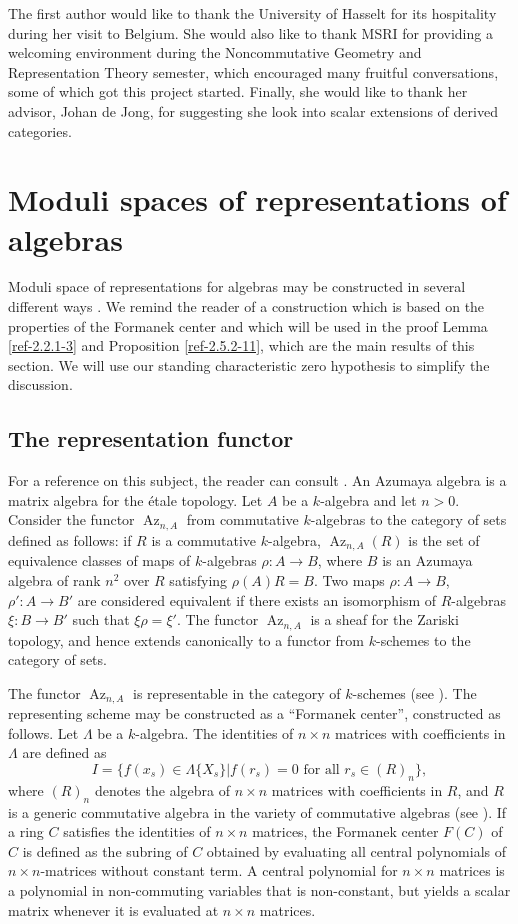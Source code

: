 \documentclass{amsart}
\numberwithin{equation}{section}
\theoremstyle{definition}
\theoremstyle{remark}
\begin{document}
The first author would like to thank the University of Hasselt for its hospitality during her visit to Belgium. She would also like to thank MSRI for providing a welcoming environment during the Noncommutative Geometry and Representation Theory semester, which encouraged many fruitful conversations, some of which got this project started. Finally, she would like to thank her advisor, Johan de Jong, for suggesting she look into scalar extensions of derived categories.

\section{Moduli spaces of representations of algebras}
Moduli space of representations for algebras 
may be constructed in several different ways \cite{King,Procesi2}.
We remind the reader of a construction which is based on the properties
of the Formanek center and which will be used in the proof Lemma \ref{ref-2.2.1-3} 
and Proposition \ref{ref-2.5.2-11}, which are the main results
of this section. We will use our standing characteristic zero hypothesis to simplify the discussion.
\subsection{The representation functor}
For a reference on this subject, the reader can consult \cite{Procesi2}. An Azumaya algebra is a matrix algebra for the \'etale topology. Let $A$ be a $k$-algebra and let $n>0$.  Consider the functor ${\operatorname{Az}}_{n,A}$
from commutative $k$-algebras to the category of sets defined as follows: if $R$
is a commutative $k$-algebra, ${\operatorname{Az}}_{n,A}(R)$ is the set of equivalence classes
of maps of $k$-algebras $\rho:A{\rightarrow} B$, where $B$ is an Azumaya algebra of rank $n^2$
over $R$ satisfying $\rho(A)R=B$. Two  maps $\rho:A{\rightarrow} B$,
$\rho':A{\rightarrow} B'$ are considered equivalent if there exists an isomorphism
of $R$-algebras $\xi:B{\rightarrow} B'$ such that $\xi\rho=\xi'$. The functor ${\operatorname{Az}}_{n,A}$ is
a sheaf for the Zariski topology, and hence extends canonically to a functor
from $k$-schemes to the category of sets.

The functor ${\operatorname{Az}}_{n,A}$ is representable in the category of $k$-schemes
(see \cite[Ch IV, Thm 1.8 and Ch VIII, Thm 2.2]{Procesi2}). The representing scheme may be constructed as a  ``Formanek
center'', constructed as follows. Let $\Lambda$ be a $k$-algebra. The identities of $n\times n$ matrices with coefficients in $\Lambda$ are defined as
$$I=\{f(x_s)\in \Lambda\{X_s\} | f(r_s)=0 \text{ for all }r_s \in (R)_n\},$$
where $(R)_n$ denotes the algebra of $n\times n$ matrices with coefficients in $R$, and $R$ is a generic commutative algebra in the variety of commutative algebras (see \cite[Definition 4.3]{Procesi2}). If a ring $C$ satisfies the identities of $n\times n$ matrices, the Formanek center $F(C)$ of $C$ is defined as the subring of $C$ obtained by evaluating all central polynomials of $n\times n$-matrices without constant term. A central polynomial for $n\times n$ matrices is a polynomial in non-commuting variables that is non-constant, but yields a scalar matrix whenever it is evaluated at $n\times n$ matrices.
\end{document}
